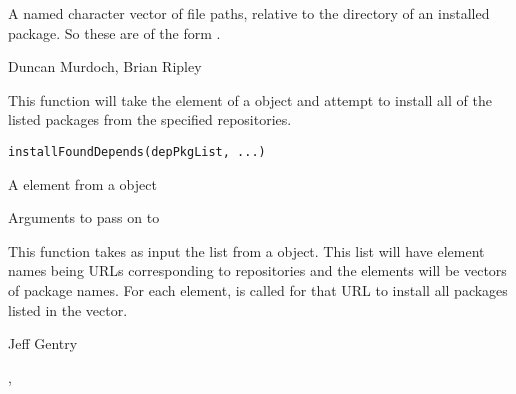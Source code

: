 %
\begin{Value}
A named character vector of file paths, relative to the 
directory of an installed package.  So these are of the form
.
\end{Value}
%
\begin{Author}\relax
Duncan Murdoch, Brian Ripley
\end{Author}
%
\begin{Description}\relax
This function will take the  element of a
 object and attempt to install 
all of the listed packages from the specified repositories.
\end{Description}
%
\begin{Usage}
\begin{verbatim}
installFoundDepends(depPkgList, ...)
\end{verbatim}
\end{Usage}
%
\begin{Arguments}
\begin{ldescription}
\item[\code{depPkgList}] A  element from a  object
\item[\code{...}] Arguments to pass on to 
\end{ldescription}
\end{Arguments}
%
\begin{Details}\relax
This function takes as input the  list from a
 object.  This list will have element names being
URLs corresponding to repositories and the elements will be vectors of
package names.  For each element,  is
called for that URL to install all packages listed in the vector.
\end{Details}
%
\begin{Author}\relax
Jeff Gentry
\end{Author}
%
\begin{SeeAlso}\relax
{}, 
\end{SeeAlso}
%
\begin{Examples}
\end{Examples}
